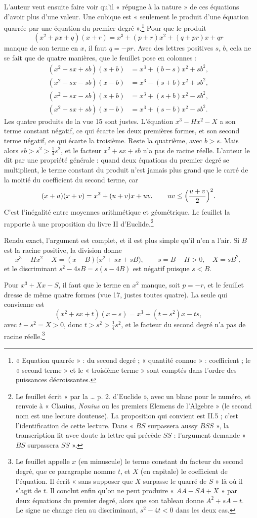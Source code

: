 \documentclass[11pt,a4paper]{article}
\begin{document}
L'auteur veut ensuite faire voir qu'il « répugne à la nature » de ces
équations d'avoir plus d'une valeur. Une cubique est « seulement le produit
d'une équation quarrée par une équation du premier degré ».\footnote{« Equation
quarrée » : du second degré ; « quantité connue » : coefficient ; le « second
terme » et le « troisième terme » sont comptés dans l'ordre des puissances
décroissantes.} Pour que le produit
\[
(x^2+px+q)(x+r)=x^3+(p+r)x^2+(q+pr)x+qr
\]
manque de son terme en \(x\), il faut \(q=-pr\). Avec des lettres positives
\(s\), \(b\), cela ne se fait que de quatre manières, que le feuillet pose en
colonnes :
\begin{align*}
(x^2-sx+sb)(x+b)&=x^3+(b-s)x^2+sb^2,\\
(x^2-sx-sb)(x-b)&=x^3-(s+b)x^2+sb^2,\\
(x^2+sx-sb)(x+b)&=x^3+(s+b)x^2-sb^2,\\
(x^2+sx+sb)(x-b)&=x^3+(s-b)x^2-sb^2.
\end{align*}
Les quatre produits de la vue 15 sont justes. L'équation \(x^3-Hx^2-X\) a son
terme constant négatif, ce qui écarte les deux premières formes, et son second
terme négatif, ce qui écarte la troisième. Reste la quatrième, avec \(b>s\).
Mais alors \(sb>s^2>\tfrac14 s^2\), et le facteur \(x^2+sx+sb\) n'a pas de
racine réelle. L'auteur le dit par une propriété générale : quand deux
équations du premier degré se multiplient, le terme constant du produit n'est
jamais plus grand que le carré de la moitié du coefficient du second terme,
car
\[
(x+u)(x+v)=x^2+(u+v)x+uv, \qquad uv\le\Bigl(\frac{u+v}{2}\Bigr)^2 .
\]
C'est l'inégalité entre moyennes arithmétique et géométrique. Le feuillet la
rapporte à une proposition du livre II d'Euclide.\footnote{Le feuillet écrit
« par la \ldots{} p. 2. d'Euclide », avec un blanc pour le numéro, et renvoie
à « Clauius, \emph{Nonius} ou les premiers Elemens de l'Algebre » (le second
nom est une lecture douteuse). La proposition qui convient est II.5 ; c'est
l'identification de cette lecture. Dans « \(BS\) surpassera aussy
\(BSS\) », la transcription lit avec doute la lettre qui précède \(SS\) :
l'argument demande « \(BS\) surpassera \(SS\) ».}

Rendu exact, l'argument est complet, et il est plus simple qu'il n'en a l'air.
Si \(B\) est la racine positive, la division donne
\[
x^3-Hx^2-X=(x-B)\bigl(x^2+sx+sB\bigr), \qquad s=B-H>0,\quad X=sB^2,
\]
et le discriminant \(s^2-4sB=s(s-4B)\) est négatif puisque \(s<B\).

Pour \(x^3+Xx-S\), il faut que le terme en \(x^2\) manque, soit \(p=-r\), et le
feuillet dresse de même quatre formes (vue 17, justes toutes quatre). La seule
qui convienne est
\[
(x^2+sx+t)(x-s)=x^3+(t-s^2)x-ts ,
\]
avec \(t-s^2=X>0\), donc \(t>s^2>\tfrac14 s^2\), et le facteur du second degré
n'a pas de racine réelle.\footnote{Le feuillet appelle \(x\) (en minuscule)
le terme constant du facteur du second degré, que ce paragraphe nomme \(t\),
et \(X\) (en capitale) le coefficient de l'équation. Il écrit « sans supposer
que \(X\) surpasse le quarré de \(S\) » là où il s'agit de \(t\). Il conclut
enfin qu'on ne peut produire « \(AA-SA+X\) » par deux équations du premier
degré, alors que son tableau donne \(A^2+sA+t\). Le signe ne change rien au
discriminant, \(s^2-4t<0\) dans les deux cas.}
\end{document}

